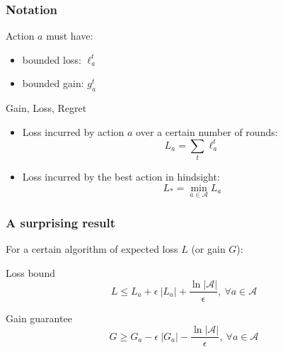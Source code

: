 \documentclass{beamer}
\begin{document}
\begin{frame}
    \frametitle{Notation}

    \begin{block}{Action $a$ must have:}
        \begin{itemize}
            \item bounded loss: $\ell_a^t$
            \item bounded gain: $g_a^t$
        \end{itemize}
    \end{block}

    \begin{block}{Gain, Loss, Regret}
        \begin{itemize}
            \item Loss incurred by action $a$ over a certain number of rounds:
                \begin{equation*}
                    L_a = \sum_t \ell_a^t 
                \end{equation*}
            \item Loss incurred by the best action in hindsight:
                \begin{equation*}
                    L_* = \min_{a\in\mathcal{A}} L_a
                \end{equation*}
        \end{itemize}
    \end{block}

\end{frame}

\begin{frame}
    \frametitle{A surprising result}

    For a certain algorithm of expected loss $L$ (or gain $G$):
    
    \begin{block}{Loss bound}
        \begin{equation*}
            L \leq L_a + \epsilon~|L_a| + \dfrac{\ln|\mathcal{A}|}{\epsilon},
            ~\forall a\in \mathcal{A}
        \end{equation*}
    \end{block}
    
    \begin{block}{Gain guarantee}
        \begin{equation*}
            G \geq G_a - \epsilon~|G_a| - \dfrac{\ln |\mathcal{A}|}{\epsilon},
            ~\forall a\in \mathcal{A}
        \end{equation*}
    \end{block}

\end{frame}
\end{document}
